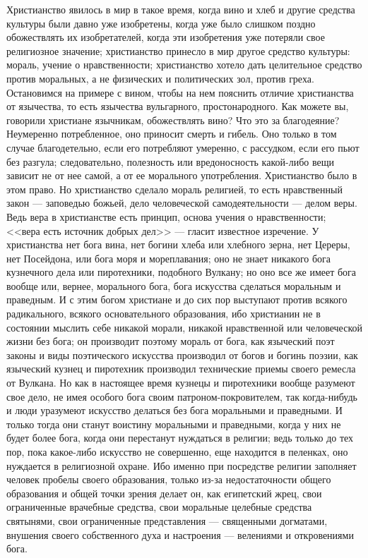 \documentclass[12pt]{article}
\begin{document}
Христианство явилось в мир в такое время, когда вино и хлеб и другие средства культуры были давно уже изобретены, когда уже было слишком поздно обожествлять их изобретателей, когда эти изобретения уже потеряли свое религиозное значение; христианство принесло в мир другое средство культуры: мораль, учение о нравственности; христианство хотело дать целительное средство против моральных, а не физических и политических зол, против греха. Остановимся на примере с вином, чтобы на нем пояснить отличие христианства от язычества, то есть язычества вульгарного, простонародного. Как можете вы, говорили христиане язычникам, обожествлять вино? Что это за благодеяние? Неумеренно потребленное, оно приносит смерть и гибель. Оно только в том случае благодетельно, если его потребляют умеренно, с рассудком, если его пьют без разгула; следовательно, полезность или вредоносность какой-либо вещи зависит не от нее самой, а от ее морального употребления. Христианство было в этом право. Но христианство сделало мораль религией, то есть нравственный закон --- заповедью божьей, дело человеческой самодеятельности --- делом веры. Ведь вера в христианстве есть принцип, основа учения о нравственности; <<вера есть источник добрых дел>> --- гласит известное изречение. У христианства нет бога вина, нет богини хлеба или хлебного зерна, нет Цереры, нет Посейдона, или бога моря и мореплавания; оно не знает никакого бога кузнечного дела или пиротехники, подобного Вулкану; но оно все же имеет бога вообще или, вернее, морального бога, бога искусства сделаться моральным и праведным. И с этим богом христиане и до сих пор выступают против всякого радикального, всякого основательного образования, ибо христианин не в состоянии мыслить себе никакой морали, никакой нравственной или человеческой жизни без бога; он производит поэтому мораль от бога, как языческий поэт законы и виды поэтического искусства производил от богов и богинь поэзии, как языческий кузнец и пиротехник производил технические приемы своего ремесла от Вулкана. Но как в настоящее время кузнецы и пиротехники вообще разумеют свое дело, не имея особого бога своим патроном-покровителем, так когда-нибудь и люди уразумеют искусство делаться без бога моральными и праведными. И только тогда они станут воистину моральными и праведными, когда у них не будет более бога, когда они перестанут нуждаться в религии; ведь только до тех пор, пока какое-либо искусство не совершенно, еще находится в пеленках, оно нуждается в религиозной охране. Ибо именно при посредстве религии заполняет человек пробелы своего образования, только из-за недостаточности общего образования и общей точки зрения делает он, как египетский жрец, свои ограниченные врачебные средства, свои моральные целебные средства святынями, свои ограниченные представления --- священными догматами, внушения своего собственного духа и настроения --- велениями и откровениями бога. 
\end{document}

